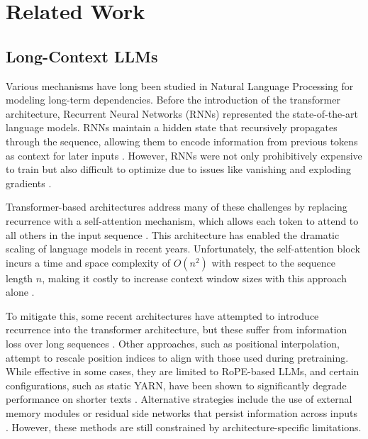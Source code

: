\cleardoublepage
\chapter{Related Work}
\label{ch:relatedwork}
\label{ch:chapter2}

\section{Long-Context LLMs}

Various mechanisms have long been studied in Natural Language Processing for modeling long-term dependencies. Before the introduction of the transformer architecture, Recurrent Neural Networks (RNNs) represented the state-of-the-art language models. RNNs maintain a hidden state that recursively propagates through the sequence, allowing them to encode information from previous tokens as context for later inputs \cite{alma991005389998907681}. However, RNNs were not only prohibitively expensive to train but also difficult to optimize due to issues like vanishing and exploding gradients \cite{dai-etal-2019-transformer}.

\noindent Transformer-based architectures address many of these challenges by replacing recurrence with a self-attention mechanism, which allows each token to attend to all others in the input sequence \cite{10.5555/3295222.3295349}. This architecture has enabled the dramatic scaling of language models in recent years. Unfortunately, the self-attention block incurs a time and space complexity of $O(n^2)$ with respect to the sequence length $n$, making it costly to increase context window sizes with this approach alone \cite{pmlr-v201-duman-keles23a}\cite{wang2023augmentinglanguagemodelslongterm}. 

\noindent To mitigate this, some recent architectures have attempted to introduce recurrence into the transformer architecture, but these suffer from information loss over long sequences \cite{dai-etal-2019-transformer}. Other approaches, such as positional interpolation, attempt to rescale position indices to align with those used during pretraining. While effective in some cases, they are limited to RoPE-based LLMs, and certain configurations, such as static YARN,  have been shown to significantly degrade performance on shorter texts \cite{ding2024longrope}\cite{peng2024yarn}.
Alternative strategies include the use of external memory modules or residual side networks that persist information across inputs \cite{wang2023augmentinglanguagemodelslongterm}. However, these methods are still constrained by architecture-specific limitations.

